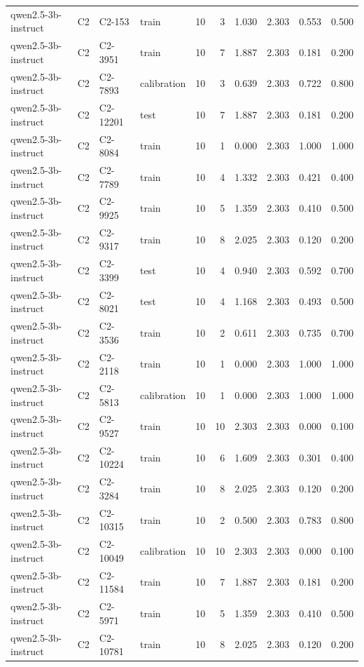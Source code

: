 \begin{table}
\begin{tabular}{llllrrrrrr}
qwen2.5-3b-instruct & C2 & C2-153 & train & 10 & 3 & 1.030 & 2.303 & 0.553 & 0.500 \\
qwen2.5-3b-instruct & C2 & C2-3951 & train & 10 & 7 & 1.887 & 2.303 & 0.181 & 0.200 \\
qwen2.5-3b-instruct & C2 & C2-7893 & calibration & 10 & 3 & 0.639 & 2.303 & 0.722 & 0.800 \\
qwen2.5-3b-instruct & C2 & C2-12201 & test & 10 & 7 & 1.887 & 2.303 & 0.181 & 0.200 \\
qwen2.5-3b-instruct & C2 & C2-8084 & train & 10 & 1 & 0.000 & 2.303 & 1.000 & 1.000 \\
qwen2.5-3b-instruct & C2 & C2-7789 & train & 10 & 4 & 1.332 & 2.303 & 0.421 & 0.400 \\
qwen2.5-3b-instruct & C2 & C2-9925 & train & 10 & 5 & 1.359 & 2.303 & 0.410 & 0.500 \\
qwen2.5-3b-instruct & C2 & C2-9317 & train & 10 & 8 & 2.025 & 2.303 & 0.120 & 0.200 \\
qwen2.5-3b-instruct & C2 & C2-3399 & test & 10 & 4 & 0.940 & 2.303 & 0.592 & 0.700 \\
qwen2.5-3b-instruct & C2 & C2-8021 & test & 10 & 4 & 1.168 & 2.303 & 0.493 & 0.500 \\
qwen2.5-3b-instruct & C2 & C2-3536 & train & 10 & 2 & 0.611 & 2.303 & 0.735 & 0.700 \\
qwen2.5-3b-instruct & C2 & C2-2118 & train & 10 & 1 & 0.000 & 2.303 & 1.000 & 1.000 \\
qwen2.5-3b-instruct & C2 & C2-5813 & calibration & 10 & 1 & 0.000 & 2.303 & 1.000 & 1.000 \\
qwen2.5-3b-instruct & C2 & C2-9527 & train & 10 & 10 & 2.303 & 2.303 & 0.000 & 0.100 \\
qwen2.5-3b-instruct & C2 & C2-10224 & train & 10 & 6 & 1.609 & 2.303 & 0.301 & 0.400 \\
qwen2.5-3b-instruct & C2 & C2-3284 & train & 10 & 8 & 2.025 & 2.303 & 0.120 & 0.200 \\
qwen2.5-3b-instruct & C2 & C2-10315 & train & 10 & 2 & 0.500 & 2.303 & 0.783 & 0.800 \\
qwen2.5-3b-instruct & C2 & C2-10049 & calibration & 10 & 10 & 2.303 & 2.303 & 0.000 & 0.100 \\
qwen2.5-3b-instruct & C2 & C2-11584 & train & 10 & 7 & 1.887 & 2.303 & 0.181 & 0.200 \\
qwen2.5-3b-instruct & C2 & C2-5971 & train & 10 & 5 & 1.359 & 2.303 & 0.410 & 0.500 \\
qwen2.5-3b-instruct & C2 & C2-10781 & train & 10 & 8 & 2.025 & 2.303 & 0.120 & 0.200 \\

\end{tabular}
\end{table}
